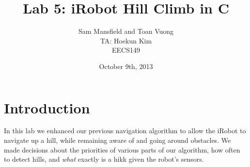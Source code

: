 \documentclass[10pt,titlepage]{article}
\begin{document}
  \title{Lab 5: iRobot Hill Climb in C}
  \author{Sam Mansfield and Toan Vuong \\
          TA: Hoekun Kim \\
          EECS149}
  \date{October 9th, 2013}
  \maketitle

  \section{Introduction}
  In this lab we enhanced our previous navigation algorithm to allow the iRobot to navigate up a hill, while remaining aware of and going around obstacles. We made decisions about the priorities of various parts of our algorithm, how often to detect hills, and \textit{what} exactly is a hikk given the robot's sensors.
\end{document}
